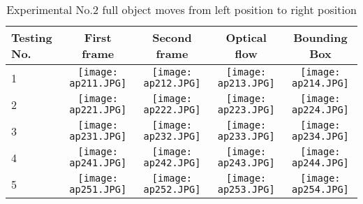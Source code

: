\begin{table}[h]
	\begin{adjustwidth}{-1.2in}{-1.2in}%
		\begin{tabular}{|p{1.1cm}|c|c|c|c|}
			\hline
			Testing No. & First frame & Second frame & Optical flow & Bounding Box \\ \hline
			1 & 
			\texttt{[image: ap211.JPG]} & \texttt{[image: ap212.JPG]} & \texttt{[image: ap213.JPG]} & \texttt{[image: ap214.JPG]} \\
			2 & 
			\texttt{[image: ap221.JPG]} & \texttt{[image: ap222.JPG]} & \texttt{[image: ap223.JPG]} & \texttt{[image: ap224.JPG]} \\
			3 & 
			\texttt{[image: ap231.JPG]} & \texttt{[image: ap232.JPG]} & \texttt{[image: ap233.JPG]} & \texttt{[image: ap234.JPG]} \\
			4 & 
			\texttt{[image: ap241.JPG]} & \texttt{[image: ap242.JPG]} & \texttt{[image: ap243.JPG]} & \texttt{[image: ap244.JPG]} \\
			5 & 
			\texttt{[image: ap251.JPG]} & \texttt{[image: ap252.JPG]} & \texttt{[image: ap253.JPG]} & \texttt{[image: ap254.JPG]} \\
			\hline
		\end{tabular}
		\caption{Experimental No.2 full object moves from left position to right position}
		\label{tab:02}
	\end{adjustwidth}
\end{table}

